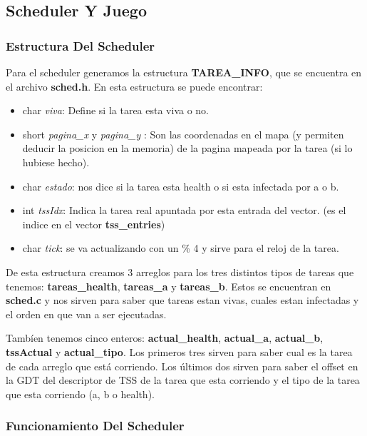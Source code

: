 \subsection{Scheduler Y Juego}


\subsubsection{Estructura Del Scheduler}

Para el scheduler generamos la estructura \textbf{TAREA_INFO}, que se encuentra en el archivo \textbf{sched.h}. En esta estructura se puede encontrar:

\begin{itemize}
\item char \textit{viva}: Define si la tarea esta viva o no.
\item short \textit{pagina_x} y \textit{pagina_y} : Son las coordenadas en el mapa (y permiten deducir la posicion en la memoria) de la pagina mapeada por la tarea (si lo hubiese hecho).
\item char \textit{estado}: nos dice si la tarea esta health o si esta infectada por a o b.
\item int \textit{tssIdx}: Indica la tarea real apuntada por esta entrada del vector. (es el indice en el vector \textbf{tss_entries})
\item char \textit{tick}: se va actualizando con un \% 4 y sirve para el reloj de la tarea.
\end{itemize}

De esta estructura creamos 3 arreglos para los tres distintos tipos de tareas que tenemos: \textbf{tareas_health}, \textbf{tareas_a} y \textbf{tareas_b}. Estos se encuentran en \textbf{sched.c} y nos sirven para saber que tareas estan vivas, cuales estan infectadas y el orden en que van a ser ejecutadas.

Tambíen tenemos cinco enteros: \textbf{actual_health}, \textbf{actual_a}, \textbf{actual_b}, \textbf{tssActual} y \textbf{actual_tipo}. Los primeros tres sirven para saber cual es la tarea de cada arreglo que está corriendo. Los últimos dos sirven para saber el offset en la GDT del descriptor de TSS de la tarea que esta corriendo y el tipo de la tarea que esta corriendo (a, b o health).


\subsubsection{Funcionamiento Del Scheduler}

